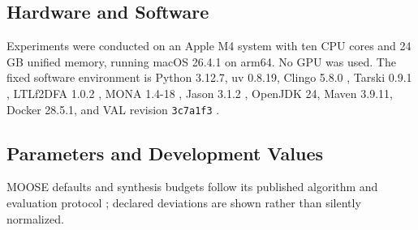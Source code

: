 \subsection{Hardware and Software}

Experiments were conducted on an Apple M4 system with ten CPU cores and 24 GB
unified memory, running macOS 26.4.1 on arm64. No GPU was used. The fixed
software environment is Python 3.12.7, uv 0.8.19, Clingo 5.8.0
\cite{Gebser2018Clingo}, Tarski 0.9.1 \cite{RamirezFrances2020Tarski},
LTLf2DFA 1.0.2 \cite{Fuggitti2020LTLf2DFA}, MONA 1.4-18
\cite{Henriksen1995MONA}, Jason 3.1.2 \cite{Bordini2007Jason}, OpenJDK 24,
Maven 3.9.11, Docker 28.5.1, and VAL revision \texttt{3c7a1f3}
\cite{Howey2004VAL}.

\subsection{Parameters and Development Values}

MOOSE defaults and synthesis budgets follow its published algorithm and
evaluation protocol \cite{Chen2026Moose}; declared deviations are shown rather
than silently normalized.

